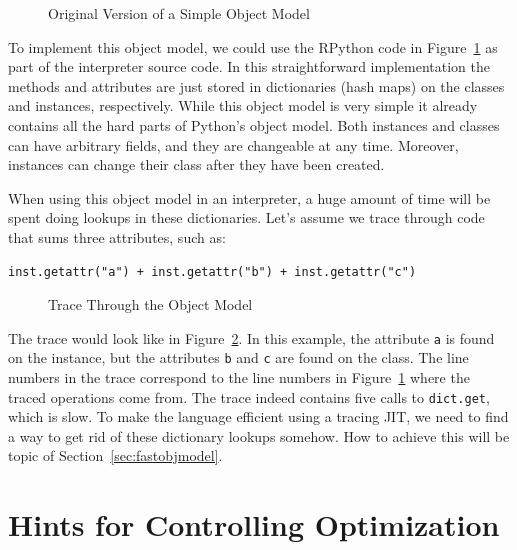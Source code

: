 \documentclass{sigplanconf}
\begin{document}
\begin{figure}

\caption{Original Version of a Simple Object Model}
\label{fig:interpreter-slow}
\end{figure}


To implement this object model, we could use the RPython code in
Figure~\ref{fig:interpreter-slow} as part of the interpreter source code.
In this straightforward implementation the methods and attributes are just
stored in dictionaries (hash maps) on the classes and instances, respectively.
While this object model is very
simple it already contains all the hard parts of Python's object model. Both
instances and classes can have arbitrary fields, and they are changeable at
any time.  Moreover, instances can change their class after they have been
created.

When using this object model in
an interpreter, a huge amount of time will be spent doing lookups in these
dictionaries.
Let's assume we trace through code that sums three attributes, such as:

\begin{lstlisting}[mathescape,basicstyle=\ttfamily]
inst.getattr("a") + inst.getattr("b") + inst.getattr("c")
\end{lstlisting}

\begin{figure}

\caption{Trace Through the Object Model}
\label{fig:trace1}
\end{figure}

The trace would look like in Figure~\ref{fig:trace1}. In this example, the
attribute \texttt{a} is found on the instance, but the
attributes \texttt{b} and \texttt{c} are found on the class. The line
numbers in the trace correspond to the line numbers in
Figure~\ref{fig:interpreter-slow} where the traced operations come from. The
trace indeed contains
five calls to \texttt{dict.get}, which is slow. To make the language efficient
using a tracing JIT, we need to find a way to get rid of these dictionary
lookups somehow. How to achieve this will be topic of
Section~\ref{sec:fastobjmodel}.






\section{Hints for Controlling Optimization}
\label{sec:hints}
\end{document}
